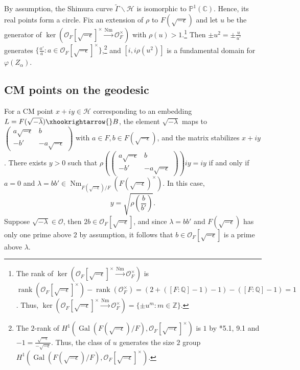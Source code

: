 \documentclass{amsart}
\numberwithin{equation}{subsection}
\numberwithin{theorem}{section}
\theoremstyle{definition}
\theoremstyle{remark}
\newcommand{\bC}{\mathbb{C}}
\newcommand{\bQ}{\mathbb{Q}}
\newcommand{\bZ}{\mathbb{Z}}
\newcommand{\cH}{\mathcal{H}}
\DeclareMathOperator{\Nm}{Nm}
\DeclareMathOperator{\Gal}{Gal}
\DeclareMathOperator{\rank}{rank}
\begin{document}
By assumption, the Shimura curve $\widetilde{\Gamma}\backslash\cH$ is isomorphic to $\mathbb{P}^1(\bC)$. Hence, its real points form a circle. 
Fix an extension of $\rho$ to $F(\sqrt{-\epsilon})$ and let $u$ be the generator of $\ker(\mathcal{O}_F[\sqrt{-\epsilon}]^\times \xrightarrow{\Nm} \mathcal{O}_F^\times)$ with $\rho(u)>1$.\footnote{The rank of $\ker(\mathcal{O}_F[\sqrt{-\epsilon}]^\times \xrightarrow{\Nm} \mathcal{O}_F^\times)$ is $\rank(\mathcal{O}_F[\sqrt{-\epsilon}]^\times) - \rank(\mathcal{O}_F^\times) = (2+([F:\bQ]-1)-1)-([F:\bQ]-1) =1$. Thus, $\ker(\mathcal{O}_F[\sqrt{-\epsilon}]^\times \xrightarrow{\Nm} \mathcal{O}_F^\times) = \{\pm u^m:m\in\bZ\}$.} 
Then $\pm u^2 = \pm \frac{u}{u'}$ generates $\{\frac{a'}{a} : a\in \mathcal{O}_F[\sqrt{-\epsilon}]^\times \}$,\footnote{The $2$-rank of $H^1(\Gal(F(\sqrt{-\epsilon})/F), \mathcal{O}_F[\sqrt{-\epsilon}]^\times )$ is $1$ by \cite{MR963648}*{5.1, 9.1} and $-1 = \frac{\sqrt{-\epsilon}}{-\sqrt{-\epsilon}}$. Thus, the class of $u$ generates the size $2$ group $H^1(\Gal(F(\sqrt{-\epsilon})/F), \mathcal{O}_F[\sqrt{-\epsilon}]^\times )$.} and $[i, i\rho(u^2)]$ is a fundamental domain for $\varphi(Z_{\alpha})$.

\subsection{CM points on the geodesic}\label{sec:CMgeodesic}
For a CM point $x+iy\in \mathcal{H}$ corresponding to an embedding $L = F(\sqrt{-\lambda}) \xhookrightarrow{} B$, the element $\sqrt{-\lambda}$ maps to $ \begin{pmatrix}
    a\sqrt{-\epsilon} & b \\ -b' &-a\sqrt{-\epsilon}
\end{pmatrix}$ with $a\in F, b\in F(\sqrt{-\epsilon})$, and the matrix stabilizes $x+iy$. 
There exists $y>0$ such that $\rho\left(\begin{pmatrix}
    a\sqrt{-\epsilon} & b \\ -b' &-a\sqrt{-\epsilon}\end{pmatrix}\right)iy = iy$  if and only if $a = 0 $ and $
    \lambda = bb'\in \Nm_{F(\sqrt{-\epsilon})/F}(F(\sqrt{-\epsilon})^\times)$. In this case, \[y = \sqrt{\rho\left(\frac{b}{b'}\right)}.\]
    Suppose $\sqrt{-\lambda} \in \mathcal{O}$, then $2b\in \mathcal{O}_F[\sqrt{-\epsilon}]$, and since $\lambda = bb'$ and $F(\sqrt{-\epsilon})$ has only one prime above $2$ by assumption, it follows that $b \in \mathcal{O}_F[\sqrt{-\epsilon}]$ is a prime above $\lambda$. 
\end{document}
